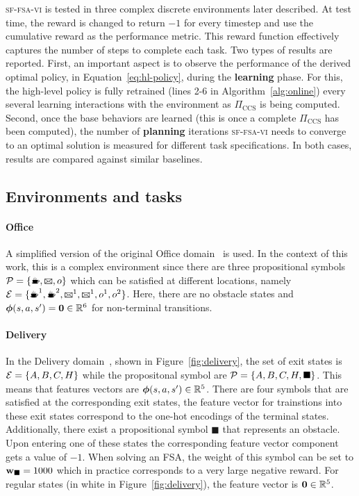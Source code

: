 \textsc{sf-fsa-vi} is tested in three complex discrete environments later described. At test time, the reward is changed to return $-1$ for every timestep and use the cumulative reward as the performance metric. This reward function effectively captures the number of steps to complete each task. Two types of results are reported. First, an important aspect is to observe the performance of the derived optimal policy, in Equation~\eqref{eq:hl-policy}, during the \textbf{learning} phase. For this, the high-level policy is fully retrained (lines 2-6 in Algorithm~\ref{alg:online}) every several learning interactions with the environment as $\Pi_\text{CCS}$ is being computed. Second, once the base behaviors are learned (this is once a complete $\Pi_\text{CCS}$ has been computed), the number of \textbf{planning} iterations \textsc{sf-fsa-vi} needs to converge to an optimal solution is measured for different task specifications. In both cases, results are compared against similar baselines.

\subsection{Environments and tasks} 

\paragraph{Office} A simplified version of the original Office domain~\citep{Icarte2018b} is used. In the context of this work, this is a complex environment since there are three propositional symbols $\cP=\{\text{\coffee}, \text{\mail}, o\}$ which can be satisfied at different locations, namely $\cE=\{\text{\coffee}^1, \text{\coffee}^2, \text{\mail}^1, \text{\mail}^1, o^1, o^2\}$. Here, there are no obstacle states and $\boldsymbol{\phi}(s,a,s')=\mathbf{0}\in\mathbb{R}^6$ for non-terminal transitions.

\paragraph{Delivery} In the Delivery domain~\citep{Araki2021}, shown in Figure~\ref{fig:delivery}, the set of exit states is ${\mathcal{E}=\{A,B,C,H\}}$ while the propositonal symbol are $\mathcal{P}=\{A,B,C,H,\blacksquare\}$. This means that features vectors are $\boldsymbol{\phi}(s,a,s')\in\mathbb{R}^5$. There are four symbols that are satisfied at the corresponding exit states, the feature vector for trainstions into these exit states correspond to the one-hot encodings of the terminal states. Additionally, there exist a propositional symbol $\blacksquare$ that represents an obstacle. Upon entering one of these states the corresponding feature vector component gets a value of $-1$. When solving an FSA, the weight of this symbol can be set to $\mathbf{w}_\blacksquare=1000$ which in practice corresponds to a very large negative reward. For regular states (in white in Figure~\ref{fig:delivery}), the feature vector is $\mathbf{0}\in\mathbb{R}^5$.


